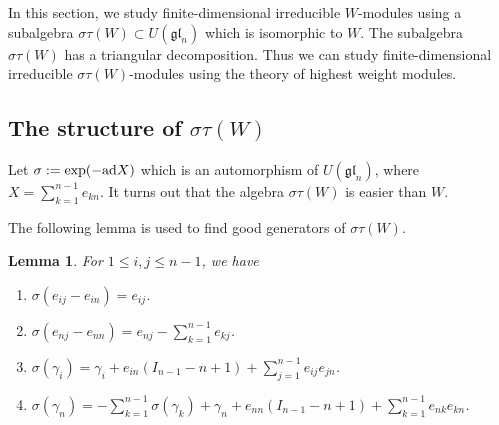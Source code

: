 \documentclass[12pt,a4paper]{amsart}
\newtheorem{lemma}[theorem]{Lemma}%
\numberwithin{equation}{section}
\def\gl{\mathfrak{gl}}
\begin{document}
In this section, we study finite-dimensional irreducible $W$-modules using a subalgebra $\sigma\tau(W)\subset U(\gl_n)$ which is isomorphic to $W$. The subalgebra $\sigma\tau(W)$ has a triangular decomposition. Thus we can study finite-dimensional irreducible $\sigma\tau(W)$-modules using the theory of highest weight modules.

\subsection{The structure of  $\sigma\tau(W)$  }

Let $\sigma:=\textup{exp}(-\textup{ad}X)$ which is an  automorphism of $U(\gl_n)$, where $X=\sum_{k=1}^{n-1}e_{kn}$.
It turns out that the algebra $\sigma\tau(W)$ is easier
 than $W$.

The following lemma is used to find good generators of $\sigma\tau(W)$.

 \begin{lemma}\label{sigma} For $1\leq i,j \leq n-1 $, we have
  \begin{enumerate}[$($1$)$]
 \item $\sigma(e_{ij}-e_{in})=e_{ij}$.
 \item $\sigma(e_{nj}-e_{nn})= e_{nj}-\sum_{k=1}^{n-1}e_{kj}$.
  \item $\sigma(\gamma_i)=\gamma_i+e_{in}(I_{n-1}-n+1)
+\sum_{j=1}^{n-1} e_{ij}e_{jn}$.
 \item $\sigma(\gamma_n)=-\sum_{k=1}^{n-1}\sigma( \gamma_k)
+\gamma_n+e_{nn}(I_{n-1}-n+1)+ \sum_{k=1}^{n-1} e_{nk}e_{kn}$.
   \end{enumerate}
\end{lemma}
\end{document}
